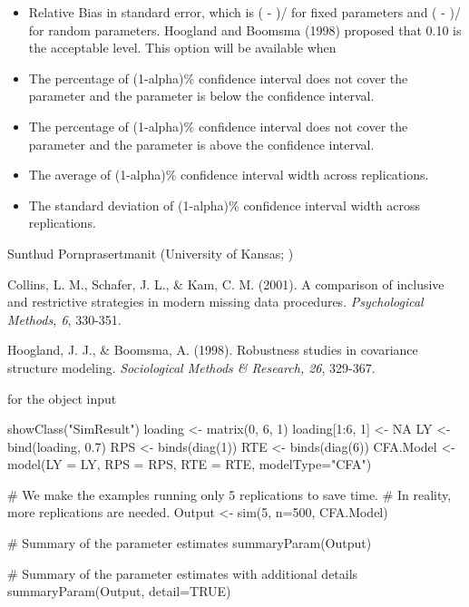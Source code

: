 \documentclass[a4paper]{book}
\begin{document}
\begin{Value}
\begin{itemize}
\item {} Relative Bias in standard error, which is ( - )/ 
for fixed parameters and ( - )/ 
for random parameters. 	Hoogland and Boomsma (1998) proposed that 0.10 is the acceptable level.
This option will be available when 
\item {} The percentage of (1-alpha)\% confidence interval does not cover the parameter and the parameter is below the confidence interval.
\item {} The percentage of (1-alpha)\% confidence interval does not cover the parameter and the parameter is above the confidence interval.
\item {} The average of (1-alpha)\% confidence interval width across replications.
\item {} The standard deviation of (1-alpha)\% confidence interval width across replications.

\end{itemize}

\end{Value}
%
\begin{Author}\relax
Sunthud Pornprasertmanit (University of Kansas; )
\end{Author}
%
\begin{References}\relax
Collins, L. M., Schafer, J. L., \& Kam, C. M. (2001). A comparison of inclusive and restrictive strategies in modern missing data procedures. \emph{Psychological Methods, 6}, 330-351.

Hoogland, J. J., \& Boomsma, A. (1998). Robustness studies in covariance structure modeling. \emph{Sociological Methods \& Research, 26}, 329-367.
\end{References}
%
\begin{SeeAlso}\relax
{} for the object input
\end{SeeAlso}
%
\begin{Examples}
\begin{ExampleCode}
showClass("SimResult")
loading <- matrix(0, 6, 1)
loading[1:6, 1] <- NA
LY <- bind(loading, 0.7)
RPS <- binds(diag(1))
RTE <- binds(diag(6))
CFA.Model <- model(LY = LY, RPS = RPS, RTE = RTE, modelType="CFA")

# We make the examples running only 5 replications to save time.
# In reality, more replications are needed.
Output <- sim(5, n=500, CFA.Model)

# Summary of the parameter estimates
summaryParam(Output)

# Summary of the parameter estimates with additional details
summaryParam(Output, detail=TRUE)
\end{ExampleCode}
\end{Examples}
\end{document}
